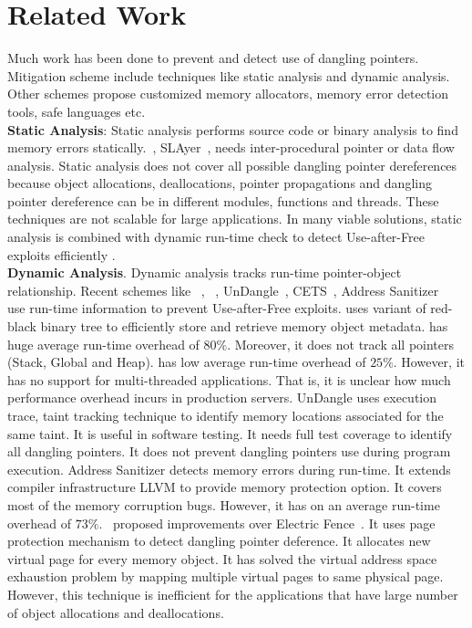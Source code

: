 \section{Related Work} \label{relatedwork}
Much work has been done to prevent and detect use of dangling pointers. Mitigation scheme include techniques like static analysis and dynamic analysis. Other schemes propose customized memory allocators, memory error detection tools, safe languages etc. \\


\textbf{Static Analysis}:
Static analysis performs source code or binary analysis to find memory errors statically.~\cite{feist2014statically}, SLAyer~\cite{berdine2011slayer},  needs inter-procedural pointer or data flow analysis. Static analysis does not cover all possible dangling pointer dereferences because object allocations, deallocations, pointer propagations and dangling pointer dereference can be in different modules, functions and threads. These techniques are not scalable for large applications. In many viable solutions, static analysis is combined with dynamic run-time check to detect Use-after-Free exploits efficiently .\\

\textbf{Dynamic Analysis}.
Dynamic analysis tracks run-time pointer-object relationship. Recent schemes like \dangnull{}~\cite{lee2015dangnull}, \freesentry{}~\cite{younan2015freesentry}, UnDangle~\cite{caballero2012undangle}, CETS~\cite{nagarakatte2010cets}, Address Sanitizer~\cite{serebryany2012addresssanitizer} use run-time information to prevent Use-after-Free exploits. \dangnull{} uses variant of red-black binary tree to efficiently store and retrieve memory object metadata. \dangnull{} has huge average run-time overhead of $80\%$. Moreover, it does not track all pointers (Stack, Global and Heap). \freesentry{} has low average run-time overhead of $25\%$. However, it has no support for multi-threaded applications. That is, it is unclear how much performance overhead \freesentry{} incurs in production servers. UnDangle uses execution trace, taint tracking technique to identify memory locations associated for the same taint. It is useful in software testing. It needs full test coverage to identify all dangling pointers. It does not prevent dangling pointers use during program execution. Address Sanitizer detects memory errors during run-time. It extends compiler infrastructure LLVM to provide memory protection option. It covers most of the memory corruption bugs. However, it has on an average run-time overhead of $73\%$.~\cite{dhurjati2006efficiently} proposed improvements over Electric Fence~\cite{dhurjati2006efficiently}. It uses page protection mechanism to detect dangling pointer deference. It allocates new virtual page for every memory object. It has solved the virtual address space exhaustion problem by mapping multiple virtual pages to same physical page. However, this technique is inefficient for the applications that have large number of object allocations and deallocations.\\

